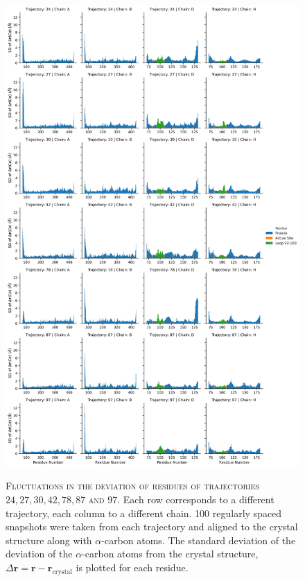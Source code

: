 \begin{figure}[ph!]
    \centering
    \caption[Fluctuations in the deviation of residues of select trajectories]{\textsc{Fluctuations in the deviation of residues of trajectories $24, 27, 30, 42, 78, 87$ and $97$}. Each row corresponds to a different trajectory, each column to a different chain. \num{100} regularly spaced snapshots were taken from each trajectory and aligned to the crystal structure along with $\alpha$-carbon atoms. The standard deviation of the deviation of the $\alpha$-carbon atoms from the crystal structure, $\Delta\mathbf{r} = \mathbf{r}-\mathbf{r}_{\mathrm{crystal}}$ is plotted for each residue.}
    \includegraphics[height=0.8\textheight]{chapters/aadh/figures/sd_dev_by_residue.png}
    \label{fig:aadh_sd_dev_by_res}
\end{figure}

